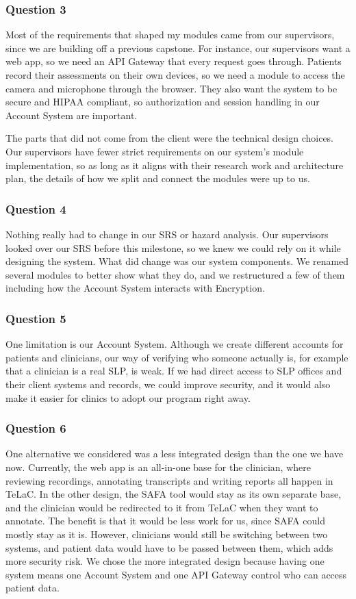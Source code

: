 \documentclass[12pt, titlepage]{article}
\begin{document}
\begin{enumerate}
\subsubsection*{Question 3}
Most of the requirements that shaped my modules came from our supervisors, since
we are building off a previous capstone. For instance, our supervisors want a web
app, so we need an API Gateway that every request goes through. Patients record
their assessments on their own devices, so we need a module to access the camera
and microphone through the browser. They also want the system to be secure and
HIPAA compliant, so authorization and session handling in our Account System are
important.

The parts that did not come from the client were the technical design choices.
Our supervisors have fewer strict requirements on our system's module implementation, so as long as it aligns with their research work and architecture
plan, the details of how we split and connect the modules were up to us.

\subsubsection*{Question 4}
Nothing really had to change in our SRS or hazard analysis. Our supervisors
looked over our SRS before this milestone, so we knew we could rely on it while
designing the system. What did change was our system components. We renamed
several modules to better show what they do, and we restructured a few of them including
how the Account System interacts with Encryption.

\subsubsection*{Question 5}
One limitation is our Account System. Although we create different accounts for
patients and clinicians, our way of verifying who someone actually is, for
example that a clinician is a real SLP, is weak. If we had direct access to SLP
offices and their client systems and records, we could improve security, and it
would also make it easier for clinics to adopt our program right away.

\subsubsection*{Question 6}
One alternative we considered was a less integrated design than the one we have
now. Currently, the web app is an all-in-one base for the clinician, where
reviewing recordings, annotating transcripts and writing reports all happen in
TeLaC. In the other design, the SAFA tool would stay as its own separate base,
and the clinician would be redirected to it from TeLaC when they want to
annotate. The benefit is that it would be less work for us, since SAFA could
mostly stay as it is. However, clinicians would still be switching between two
systems, and patient data would have to be passed
between them, which adds more security risk. We chose the more integrated design
because having one system means one Account System and one API Gateway control who can access
patient data.

\end{enumerate}
\end{document}
